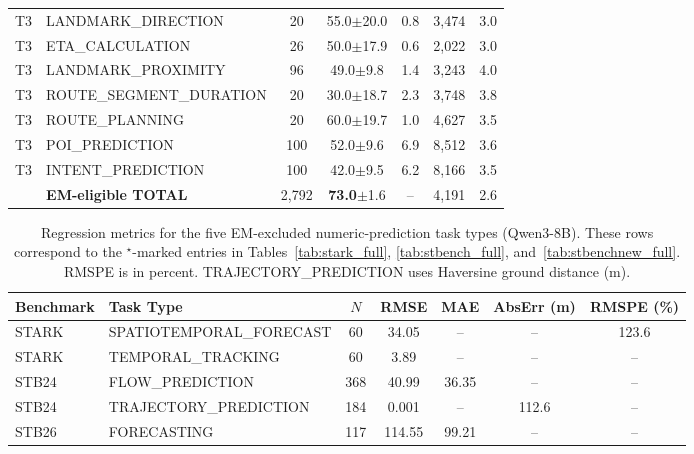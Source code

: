 \begin{table}[!htbp]
\begin{tabular}{llccccc}
\midrule
T3 & LANDMARK\_DIRECTION          & 20  & 55.0\tiny{$\pm$20.0}  & 0.8 & 3{,}474 & 3.0 \\
T3 & ETA\_CALCULATION             & 26  & 50.0\tiny{$\pm$17.9}  & 0.6 & 2{,}022 & 3.0 \\
T3 & LANDMARK\_PROXIMITY          & 96  & 49.0\tiny{$\pm$9.8}   & 1.4 & 3{,}243 & 4.0 \\
T3 & ROUTE\_SEGMENT\_DURATION     & 20  & 30.0\tiny{$\pm$18.7}  & 2.3 & 3{,}748 & 3.8 \\
T3 & ROUTE\_PLANNING              & 20  & 60.0\tiny{$\pm$19.7}  & 1.0 & 4{,}627 & 3.5 \\
T3 & POI\_PREDICTION              & 100 & 52.0\tiny{$\pm$9.6}   & 6.9 & 8{,}512 & 3.6 \\
T3 & INTENT\_PREDICTION           & 100 & 42.0\tiny{$\pm$9.5}   & 6.2 & 8{,}166 & 3.5 \\
\midrule
& \textbf{EM-eligible TOTAL}       & 2{,}792 & \textbf{73.0}\tiny{$\pm$1.6} & -- & 4{,}191 & 2.6 \\
\bottomrule
\end{tabular}
\end{table}

\begin{table}[!htbp]
\centering
\caption{Regression metrics for the five EM-excluded numeric-prediction task types (Qwen3-8B). These rows correspond to the $^\star$-marked entries in Tables~\ref{tab:stark_full}, \ref{tab:stbench_full}, and~\ref{tab:stbenchnew_full}. RMSPE is in percent.  TRAJECTORY\_PREDICTION uses Haversine ground distance (m).}
\label{tab:regression_metrics}
\small
\setlength{\tabcolsep}{4pt}
\begin{tabular}{llccccc}
\toprule
Benchmark & Task Type & $N$ & RMSE & MAE & AbsErr (m) & RMSPE (\%) \\
\midrule
STARK           & SPATIOTEMPORAL\_FORECAST & 60  & 34.05   & --     & --     & 123.6 \\
STARK           & TEMPORAL\_TRACKING       & 60  & 3.89    & --     & --     & --    \\
STB24         & FLOW\_PREDICTION         & 368 & 40.99   & 36.35  & --     & --    \\
STB24         & TRAJECTORY\_PREDICTION   & 184 & 0.001   & --     & 112.6  & --    \\
STB26 & FORECASTING              & 117 & 114.55  & 99.21  & --     & --    \\
\bottomrule
\end{tabular}
\end{table}


